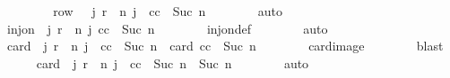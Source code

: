 \begin{isabellebody}
\ \ \isamarkupfalse%
{\isacharminus}\isanewline
\ \ \ \ \isamarkupfalse%
\ {\isachardoublequoteopen}{\isacharquery}row\ {\isacharequal}\ {\isacharparenleft}{\isasymlambda}\ j{\isachardot}\ {\isacharparenleft}r{}\ {\isacharplus}\ n{\isacharcomma}\ j{\isacharparenright}{\isacharparenright}\ {\isacharbackquote}\ {\isacharbraceleft}c{}{\isachardot}{\isachardot}{\isacharless}c{}\ {\isacharplus}\ Suc\ n{\isacharbraceright}{\isachardoublequoteclose}\isanewline
\ \ \ \ \ \ \isamarkupfalse%
\ auto\isanewline
\ \ \ \ \isamarkupfalse%
\isanewline
\ \ \ \ \isamarkupfalse%
\ {\isachardoublequoteopen}inj{\isacharunderscore}on\ {\isacharparenleft}{\isasymlambda}\ j{\isachardot}\ {\isacharparenleft}r{}\ {\isacharplus}\ n{\isacharcomma}\ j{\isacharparenright}{\isacharparenright}\ {\isacharbraceleft}c{}{\isachardot}{\isachardot}{\isacharless}c{}\ {\isacharplus}\ Suc\ n{\isacharbraceright}{\isachardoublequoteclose}\isanewline
\ \ \ \ \ \ \isamarkupfalse%
\ inj{\isacharunderscore}on{\isacharunderscore}def\isanewline
\ \ \ \ \ \ \isamarkupfalse%
\ auto\isanewline
\ \ \ \ \isamarkupfalse%
\ {\isachardoublequoteopen}card\ {\isacharparenleft}{\isacharparenleft}{\isasymlambda}\ j{\isachardot}\ {\isacharparenleft}r{}\ {\isacharplus}\ n{\isacharcomma}\ j{\isacharparenright}{\isacharparenright}\ {\isacharbackquote}\ {\isacharbraceleft}c{}{\isachardot}{\isachardot}{\isacharless}c{}\ {\isacharplus}\ Suc\ n{\isacharbraceright}{\isacharparenright}\ {\isacharequal}\ card\ {\isacharbraceleft}c{}{\isachardot}{\isachardot}{\isacharless}c{}\ {\isacharplus}\ Suc\ n{\isacharbraceright}{\isachardoublequoteclose}\isanewline
\ \ \ \ \ \ \isamarkupfalse%
\ card{\isacharunderscore}image\isanewline
\ \ \ \ \ \ \isamarkupfalse%
\ blast\isanewline
\ \ \ \ \isamarkupfalse%
\ {\isachardoublequoteopen}card\ {\isacharparenleft}{\isacharparenleft}{\isasymlambda}\ j{\isachardot}\ {\isacharparenleft}r{}\ {\isacharplus}\ n{\isacharcomma}\ j{\isacharparenright}{\isacharparenright}\ {\isacharbackquote}\ {\isacharbraceleft}c{}{\isachardot}{\isachardot}{\isacharless}c{}\ {\isacharplus}\ Suc\ n{\isacharbraceright}{\isacharparenright}\ {\isacharequal}\ Suc\ n{\isachardoublequoteclose}\isanewline
\ \ \ \ \ \ \isamarkupfalse%
\ auto\isanewline
\ \ \ \ \isamarkupfalse%

\end{isabellebody}
